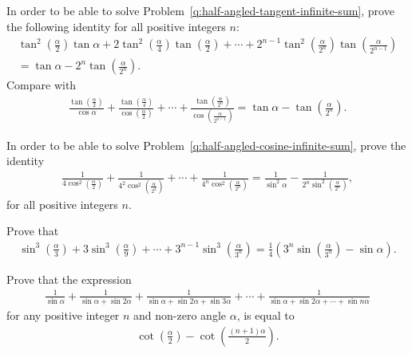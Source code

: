 \begin{question}\label{q:half-angled-tangent-finite-sum}
    In order to be able to solve Problem~\ref{q:half-angled-tangent-infinite-sum}, prove the following identity for all positive integers $n$:
    \begin{multline*}
        \tan^2\left(\frac{\alpha}{2}\right)\tan \alpha + 2\tan^2\left(\frac{\alpha}{4}\right)\tan\left(\frac{\alpha}{2}\right)+ \cdots + 2^{n-1}\tan^2\left(\frac{\alpha}{2^n}\right)\tan\left(\frac{\alpha}{2^{n-1}}\right) \\= \tan \alpha - 2^n\tan\left(\frac{\alpha}{2^n}\right).
    \end{multline*}
    Compare with
    \begin{align*}
        \displaystyle \frac{\tan\left(\frac{\alpha}{2}\right)}{\cos \alpha} + \frac{\tan\left(\frac{\alpha}{4}\right)}{\cos\left(\frac{\alpha}{2}\right)} + \cdots + \frac{\tan\left(\frac{\alpha}{2^n}\right)}{\cos\left(\frac{\alpha}{2^{n-1}}\right)} = \tan \alpha - \tan\left(\frac{\alpha}{2^n}\right).
    \end{align*}
\end{question}



\begin{question}\label{q:half-angled-cosine-finite-sum}
    In order to be able to solve Problem~\ref{q:half-angled-cosine-infinite-sum}, prove the identity
    \begin{align*}
        \frac{1}{\displaystyle 4\cos^2\left(\frac{\alpha}{2}\right)}+\frac{1}{\displaystyle 4^2\cos^2\left(\frac{\alpha}{2^2}\right)} + \cdots + \frac{1}{\displaystyle 4^n\cos^2\left(\frac{\alpha}{2^n}\right)} = \frac{1}{\sin^2 \alpha} - \frac{1}{2^n\sin^2\left(\frac{\alpha}{2^n}\right)},
    \end{align*}
    for all positive integers $n$.
\end{question}


\begin{question}
    Prove that
    \begin{align*}
        \sin^3\left(\frac{\alpha}{3}\right) + 
        3\sin^3\left(\frac{\alpha}{9}\right) + \cdots +  
        3^{n-1}\sin^3\left(\frac{\alpha}{3^n}\right) = \frac{1}{4}\left(3^{n}\sin\left(\frac{\alpha}{3^n}\right)-\sin\alpha\right).
    \end{align*}
\end{question}


\begin{question}
    Prove that the expression
    \begin{align*}
        \frac{1}{\sin \alpha} + \frac{1}{\sin\alpha+\sin 2\alpha} + \frac{1}{\sin\alpha + \sin 2\alpha + \sin 3\alpha} + \cdots + \frac{1}{\sin\alpha + \sin 2\alpha + \cdots + \sin n\alpha}
    \end{align*}
    for any positive integer $n$ and non-zero angle $\alpha$, is equal to
    \begin{align*}
        \cot\left(\frac{\alpha}{2}\right) - \cot\left(\frac{(n+1)\alpha}{2}\right).
    \end{align*}
\end{question}

